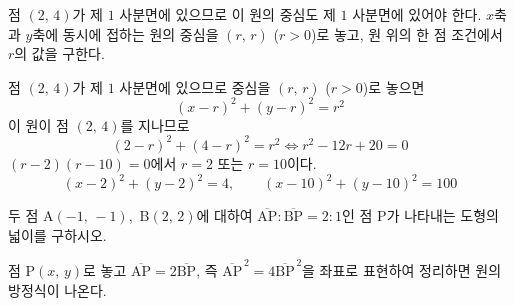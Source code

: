 \documentclass[10pt]{article}
\begin{document}
\begin{dmapproach}
점 $(2,\, 4)$가 제 $1$ 사분면에 있으므로 이 원의 중심도 제 $1$ 사분면에 있어야 한다. $x$축과 $y$축에 동시에 접하는 원의 중심을 $(r,\, r)$ ($r > 0$)로 놓고, 원 위의 한 점 조건에서 $r$의 값을 구한다.
\end{dmapproach}

\begin{dmsolution}
점 $(2,\, 4)$가 제 $1$ 사분면에 있으므로 중심을 $(r,\, r)$ ($r > 0$)로 놓으면
\begin{equation*}
  (x - r)^2 + (y - r)^2 = r^2
\end{equation*}
이 원이 점 $(2,\, 4)$를 지나므로
\begin{equation*}
  (2 - r)^2 + (4 - r)^2 = r^2 \iff r^2 - 12r + 20 = 0
\end{equation*}
$(r - 2)(r - 10) = 0$에서 $r = 2$ 또는 $r = 10$이다.
\begin{equation*}
  (x - 2)^2 + (y - 2)^2 = 4, \qquad (x - 10)^2 + (y - 10)^2 = 100
\end{equation*}
\end{dmsolution}

\dmchecktitle



\newpage


\begin{dmproblem}
두 점 $\mathrm{A}(-1,\, -1)$,\ $\mathrm{B}(2,\, 2)$에 대하여 $\overline{\mathrm{AP}} : \overline{\mathrm{BP}} = 2 : 1$인 점 $\mathrm{P}$가 나타내는 도형의 넓이를 구하시오.
\end{dmproblem}

\begin{dmapproach}
점 $\mathrm{P}(x,\, y)$로 놓고 $\overline{\mathrm{AP}} = 2\overline{\mathrm{BP}}$, 즉 $\overline{\mathrm{AP}}^{\,2} = 4\overline{\mathrm{BP}}^{\,2}$을 좌표로 표현하여 정리하면 원의 방정식이 나온다.
\end{dmapproach}
\end{document}
